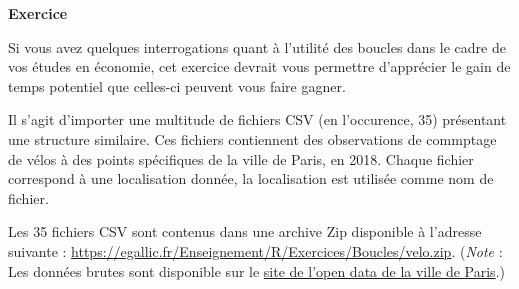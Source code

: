\documentclass[
  11pt,
]{book}
\numberwithin{equation}{section}
\numberwithin{countremarque}{section}
\newenvironment{greenbox}{
  \begin{tcolorbox}[breakable, colback=vert,coltext=black,
                  colframe=grisfonce]}
 {\end{tcolorbox}}
\begin{document}
\begin{greenbox}

\textbf{Exercice}

Si vous avez quelques interrogations quant à l'utilité des boucles dans le cadre de vos études en économie, cet exercice devrait vous permettre d'apprécier le gain de temps potentiel que celles-ci peuvent vous faire gagner.

Il s'agit d'importer une multitude de fichiers CSV (en l'occurence, 35) présentant une structure similaire. Ces fichiers contiennent des observations de commptage de vélos à des points spécifiques de la ville de Paris, en 2018. Chaque fichier correspond à une localisation donnée, la localisation est utilisée comme nom de fichier.

Les 35 fichiers CSV sont contenus dans une archive Zip disponible à l'adresse suivante : \url{https://egallic.fr/Enseignement/R/Exercices/Boucles/velo.zip}. (\emph{Note} : Les données brutes sont disponible sur le \href{https://opendata.paris.fr/explore/dataset/comptage-velo-historique-donnees-compteurs/information/}{site de l'open data de la ville de Paris}.)


\end{greenbox}
\end{document}
